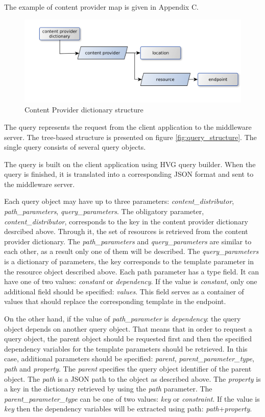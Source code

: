The example of content provider map is given in Appendix C.


\begin{figure}[h]
    \centering
	\includegraphics[width=\textwidth]{images/content_provider_map.png}
    \caption{Content Provider dictionary structure}
    \label{fig:content_provider_map}
\end{figure}


The query represents the request from the client application to the middleware server. The tree-based structure is presented on figure \ref{fig:query_structure}. The single query consists of several query objects.

The query is built on the client application using HVG query builder. When the query is finished, it is translated into a corresponding JSON format and sent to the middleware server.

Each query object may have up to three parameters: \textit{content\_distributor}, \textit{path\_parameters}, \textit{query\_parameters}. The obligatory parameter, \textit{content\_distributor}, corresponds to the key in the content provider dictionary desrcibed above. Through it, the set of resources is retrieved from the content provider dictionary. The \textit{path\_parameters} and \textit{query\_parameters} are similar to each other, as a result only one of them will be described. The \textit{query\_parameters} is a dictionary of parameters, the key corresponds to the template parameter in the resource object described above. Each path parameter has a type field. It can have one of two values: \textit{constant} or \textit{dependency}. If the value is \textit{constant}, only one additional field should be specified: \textit{values}. This field serves as a container of values that should replace the corresponding template in the endpoint. 

On the other hand, if the value of \textit{path\_parameter} is \textit{dependency}: the query object depends on another query object. That means that in order to request a query object, the parent object should be requested first and then the specified dependency variables for the template parameters should be retrieved. In this case, additional parameters should be specified: \textit{parent}, \textit{parent\_parameter\_type}, \textit{path} and \textit{property}. The \textit{parent} specifies the query object identifier of the parent object. The \textit{path} is a JSON path to the object as described above. The \textit{property} is a key in the dictionary retrieved by using the \textit{path} parameter. The \textit{parent\_parameter\_type} can be one of two values: \textit{key} or \textit{constraint}. If the value is \textit{key} then the dependency variables will be extracted using path: \textit{path}+\textit{property}.

